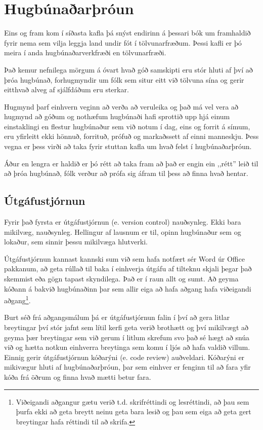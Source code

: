 
\chapter{Hugbúnaðarþróun}\label{k:dev}
Eins og fram kom í síðasta kafla þá snýst endirinn á þessari bók um framhaldið fyrir nema sem vilja leggja land undir fót í tölvunarfræðum.
Þessi kafli er þó meira í anda hugbúnaðarverkfræði en tölvunarfræði.

Það kemur nefnilega mörgum á óvart hvað góð samskipti eru stór hluti af því að þróa hugbúnað, forhugmyndir um fólk sem situr eitt við tölvuna sína og gerir eitthvað alveg af sjálfdáðum eru sterkar.

Hugmynd þarf einhvern veginn að verða að veruleika og það má vel vera að hugmynd að góðum og nothæfum hugbúnaði hafi sprottið upp hjá einum einstaklingi en flestur hugbúnaður sem við notum í dag, eins og forrit á símum, eru yfirleitt ekki hönnuð, forrituð, prófuð og markaðssett af einni manneskju.
Þess vegna er þess virði að taka fyrir stuttan kafla um hvað felst í hugbúnaðarþróun.

Áður en lengra er haldið er þó rétt að taka fram að það er engin ein ,,rétt'' leið til að þróa hugbúnað, fólk verður að prófa sig áfram til þess að finna hvað hentar.

\section{Útgáfustjórnun}
Fyrir það fyrsta er útgáfustjórnun (e. version control) nauðsynleg.
Ekki bara mikilvæg, nauðsynleg.
Hellingur af lausnum er til, opinn hugbúnaður sem og lokaður, sem sinnir þessu mikilvæga hlutverki.

Útgáfustjórnun kannast kannski sum við sem hafa notfært sér Word úr Office pakkanum, að geta rúllað til baka í einhverja útgáfu af tilteknu skjali þegar það skemmist eða gögn tapast skyndilega.
Það er í raun allt og sumt.
Að geyma kóðann á bakvið hugbúnaðinn þar sem allir eiga að hafa aðgang hafa viðeigandi aðgang\footnote{
	Viðeigandi aðgangur gætu verið t.d. skrifréttindi og lesréttindi, að þau sem þurfa ekki að geta breytt neinu geta bara lesið og þau sem eiga að geta gert breytingar hafa réttindi til að skrifa.
}.

Burt séð frá aðgangsmálum þá er útgáfustjórnun falin í því að gera litlar breytingar því stór jafnt sem lítil kerfi geta verið brothætt og því mikilvægt að geyma þær breytingar sem við gerum í litlum skrefum svo það sé hægt að snúa við og hætta notkun einhverra breytinga sem komu í ljós að hafa valdið villum.
Einnig gerir útgáfustjórnun kóðarýni (e. code review) auðveldari.
Kóðarýni er mikivægur hluti af hugbúnaðarþróun, þar sem einhver er fenginn til að fara yfir kóða frá öðrum og finna hvað mætti betur fara.

